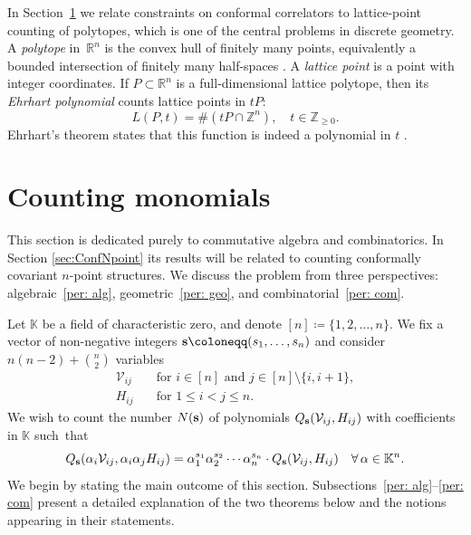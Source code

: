 \documentclass[12pt,a4paper]{extarticle}
\theoremstyle{definition}
\newcommand{\K}{\mathbb{K}}
\begin{document}
\medskip

In Section~\ref{sec:matching_pols} we relate constraints on
conformal correlators to lattice-point counting of polytopes, which is one of the central problems in discrete geometry.  A
\emph{polytope} in~$\mathbb{R}^n$ is the convex hull of finitely many points,
equivalently a bounded intersection of finitely many half-spaces
\cite[Sec.~1.1]{Ziegler}. A \emph{lattice point} is a point with integer
coordinates. If $P\subset\mathbb{R}^n$ is a full-dimensional lattice polytope,
then its \emph{Ehrhart polynomial} counts lattice points in $tP$:
\begin{equation}\label{eq: Ehrhart preliminaries}
 L(P,t)=\#(tP\cap\mathbb{Z}^n),
    \quad t\in\mathbb{Z}_{\geq 0}.   
\end{equation}
Ehrhart's theorem states that this function is indeed a polynomial in $t$
\cite[Theorem~12.2]{CCA}.

\section{Counting monomials}
\label{sec:matching_pols}

This section is dedicated purely to commutative algebra and combinatorics. In Section \ref{sec:ConfNpoint} its results will be related to counting conformally covariant 
$n$-point structures. We discuss the problem from three perspectives: algebraic~\eqref{per: alg}, geometric~\eqref{per: geo}, and combinatorial~\eqref{per: com}.

\medskip

Let $\K$ be a field of characteristic zero, and denote $[n]\coloneqq\{1,2,\ldots,n\}$. 
We fix a vector of non-negative integers ${\bf s}\coloneqq (s_1,\ldots,s_n)$ and consider 
$n(n-2)+\binom{n}{2}$ variables
\begin{align*}
\mathcal{V}_{ij} \quad & \text{for } i \in [n] \text{ and } 
j \in [n] \setminus \{i,i+1\}, \\
H_{ij} \quad & \text{for } 1 \le i < j \le n.
\end{align*}
We wish to count the number $N({\bf s})$ of polynomials
$
Q_{\bf s}(\mathcal{V}_{ij}, H_{ij})
$ with coefficients in $\K$
such~that
\begin{equation} \label{eq: hom_condition sec 3}
    Q_{\bf s}(\alpha_i \mathcal{V}_{ij}, \alpha_i \alpha_jH_{ij}) = \alpha_1^{s_1}\alpha_2^{s_2} \cdots \alpha_n^{s_n} \cdot Q_{\bf s}(\mathcal{V}_{ij}, H_{ij}) \quad \forall\, \alpha \in\K^n.
\end{equation}
We begin by stating the main outcome of this section. Subsections~\ref{per: alg}–\ref{per: com} present a detailed explanation of the two theorems below and the notions appearing in their statements.
\end{document}
